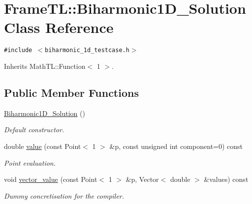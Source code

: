 \hypertarget{classFrameTL_1_1Biharmonic1D__Solution}{
\section{FrameTL::Biharmonic1D\_\-Solution Class Reference}
\label{classFrameTL_1_1Biharmonic1D__Solution}
}
{\tt \#include $<$biharmonic\_\-1d\_\-testcase.h$>$}

Inherits MathTL::Function$<$ 1 $>$.

\subsection*{Public Member Functions}
\begin{CompactItemize}
\item 
\hypertarget{classFrameTL_1_1Biharmonic1D__Solution_0ac47ada14854cf3055e551c24c15d23}{
\hyperlink{classFrameTL_1_1Biharmonic1D__Solution_0ac47ada14854cf3055e551c24c15d23}{Biharmonic1D\_\-Solution} ()}
\label{classFrameTL_1_1Biharmonic1D__Solution_0ac47ada14854cf3055e551c24c15d23}

\begin{CompactList}\small\item\em Default constructor. \item\end{CompactList}\item 
\hypertarget{classFrameTL_1_1Biharmonic1D__Solution_24f451d77510c4e288e0bdf7fb7b5034}{
double \hyperlink{classFrameTL_1_1Biharmonic1D__Solution_24f451d77510c4e288e0bdf7fb7b5034}{value} (const Point$<$ 1 $>$ \&p, const unsigned int component=0) const }
\label{classFrameTL_1_1Biharmonic1D__Solution_24f451d77510c4e288e0bdf7fb7b5034}

\begin{CompactList}\small\item\em Point evaluation. \item\end{CompactList}\item 
\hypertarget{classFrameTL_1_1Biharmonic1D__Solution_06eca619ffab0ade6671bcdd9bdd15ae}{
void \hyperlink{classFrameTL_1_1Biharmonic1D__Solution_06eca619ffab0ade6671bcdd9bdd15ae}{vector\_\-value} (const Point$<$ 1 $>$ \&p, Vector$<$ double $>$ \&values) const }
\label{classFrameTL_1_1Biharmonic1D__Solution_06eca619ffab0ade6671bcdd9bdd15ae}

\begin{CompactList}\small\item\em Dummy concretisation for the compiler. \item\end{CompactList}\end{CompactItemize}


